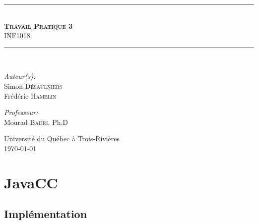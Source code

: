 \documentclass[11pt,french]{article}
\begin{document}
    \begin{titlepage}
        \begin{center}
            \noindent\rule{13cm}{1pt}\\[0.4cm]
            \textsc{\huge \bfseries Travail Pratique 3}\\
                                    INF1018\\[0.4cm]
            \noindent\rule{13cm}{1pt}\\[5cm]

            \begin{minipage}{0.4\textwidth}
                \begin{flushleft}
                \large\emph{Auteur(s):}\\[0.5cm]
                    Simon \textsc{Désaulniers}\\
                    Frédéric \textsc{Hamelin}
                \end{flushleft}
            \end{minipage}
            \begin{minipage}{0.5\textwidth}
                \begin{flushright} \large
                    \emph{Professeur:} \\[0.5cm]
                    Mourad \textsc{Badri}, Ph.D
                    \vspace{\parskip}
                \end{flushright}
            \end{minipage}

            \vfill
            {\large Université du Québec à Trois-Rivières\\ \today}
        \end{center}
        \thispagestyle{empty}
    \end{titlepage}

    \setcounter{page}{1}


    \section{JavaCC} %
    \label{sec:javacc}
        \subsection{Implémentation} %
        \label{sub:implementation}
\end{document}
